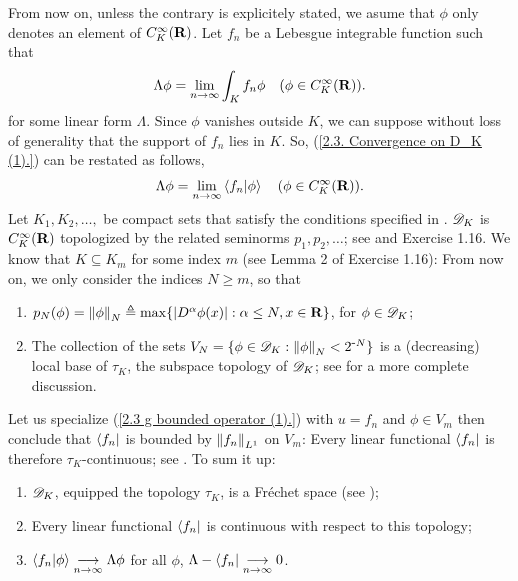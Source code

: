 From now on, unless the contrary is explicitely stated, %
we asume that $\phi$ only denotes an element of $C_K^\infty(\R)$. 
Let $f_n$ be a Lebesgue integrable function such that %
%
  \begin{align}\label{2.3. Convergence on D_K (1).}
    \Lambda \phi = \underset{n \to \infty}{\lim} 
      \int_{K} f_n\phi 
      \quad (\phi \in C_K^\infty(\R)).
  \end{align}
%
for some linear form $\Lambda$. %
%
Since $\phi$ vanishes outside $K$, we can suppose without loss of generality %
that the support of $f_n$ lies in $K$. So, %
%
  (\ref{2.3. Convergence on D_K (1).}) %
% 
can be restated as follows, 
%
  \begin{align}
    \Lambda \phi = \underset{n \to \infty}{\lim} 
      \bra{f_n}\ket{\phi} 
      \quad (\phi \in C_K^\infty(\R)).
  \end{align}
%
Let $K_1, K_2, \dots, $ be compact sets that satisfy the conditions 
specified in . %
$\D_K$ is $C_K^\infty(\R)$ topologized by the related seminorms %
%
  $p_1, p_2, \dots$; see  and Exercise 1.16.
%
We know that $K\subseteq K_m$ for some index $m$ %
(see Lemma 2 of Exercise 1.16): From now on, we only consider the indices 
$N \geq m$, so that%
%
  \renewcommand{\labelenumi}{(\alph{enumi})}%
  \begin{enumerate}
    \item{
      $p_N(\phi) = \norma{N}{\phi} \Def \max 
      \set{\lvert D^{\alpha}\phi(x) \rvert}{\alpha \leq N, x \in \R}$, %
      for $\phi \in \D_K$;
    }
    \item{
      The collection of the sets %
      $V_N = \set{ \phi \in \D_K}{ \norma{N}{\phi} < 2^{\minus N}}$ %
      is a (decreasing) local base of $\tau_K$, the subspace topology of $\D_K$; %
      see  for a more complete discussion.
    }
  \end{enumerate}
  \renewcommand{\labelenumi}{(\roman{enumi})}
%
Let us specialize (\ref{2.3  g  bounded operator (1).}) with %
%
  $u=f_n$ and $ \phi \in V_m$ %
%
then conclude that $\bra{f_n}$ is bounded by $\norma{L^1}{f_n}$ on $V_m$: %
Every linear functional $\bra{f_n}$ is therefore $\tau_K$-continuous; see %
%
  . \newline\newline\noindent
%
To sum it up: %
%
  \begin{enumerate}
    \item{$\D_K$, equipped the topology $\tau_K$, is a Fréchet space %
      (see )};
    \item{Every linear functional $\bra{f_n}$ is continuous %
      with respect to this topology;}
    \item{
      $\bra{f_n}\ket{\phi} \tendsto{n}{\infty} \Lambda \phi$ for all $\phi$, 
        \ie 
      $ \Lambda-\bra{f_n} \tendsto{n}{\infty}0$.
    }
  \end{enumerate}
